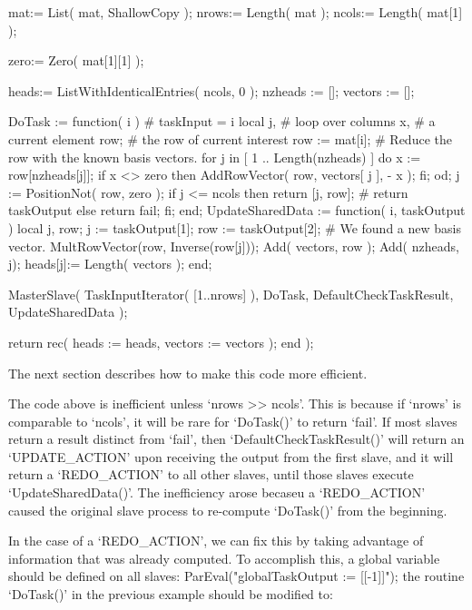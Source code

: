     mat:= List( mat, ShallowCopy );
    nrows:= Length( mat );
    ncols:= Length( mat[1] );

    zero:= Zero( mat[1][1] );

    heads:= ListWithIdenticalEntries( ncols, 0 );
    nzheads := [];
    vectors := [];

    DoTask := function( i ) # taskInput = i
      local j,         # loop over columns
            x,         # a current element
            row;       # the row of current interest
      row := mat[i];
      # Reduce the row with the known basis vectors.
      for j in [ 1 .. Length(nzheads) ] do
          x := row[nzheads[j]];
          if x <> zero then
              AddRowVector( row, vectors[ j ], - x );
          fi;
      od;
      j := PositionNot( row, zero );
      if j <= ncols then return [j, row]; # return taskOutput
      else return fail; fi;
    end;
    UpdateSharedData := function( i, taskOutput )
      local j, row;
      j := taskOutput[1];
      row := taskOutput[2];
      # We found a new basis vector.
      MultRowVector(row, Inverse(row[j]));
      Add( vectors, row );
      Add( nzheads, j);
      heads[j]:= Length( vectors );
    end;
    
    MasterSlave( TaskInputIterator( [1..nrows] ), DoTask, DefaultCheckTaskResult,
                  UpdateSharedData );

    return rec( heads   := heads,
                vectors := vectors );
end );
\endexample

The next section describes how to make this code more efficient.


The code above is inefficient unless `nrows >> ncols'.  This is
because if `nrows' is comparable to `ncols', it will be rare for
`DoTask()' to return `fail'.  If most slaves return a result distinct
from `fail', then `DefaultCheckTaskResult()' will return an
`UPDATE_ACTION' upon receiving the output from the first slave, and it
will return a `REDO_ACTION' to all other slaves, until those slaves
execute `UpdateSharedData()'.  The inefficiency arose becaseu a
`REDO_ACTION' caused the original slave process to re-compute
`DoTask()' from the beginning.


In the case of a `REDO_ACTION', we can fix this by taking advantage of
information that was already computed.  To accomplish this, a global
variable should be defined on all slaves:
\beginexample
ParEval("globalTaskOutput := [[-1]]");
\endexample
the routine `DoTask()' in the previous example should be modified to:

